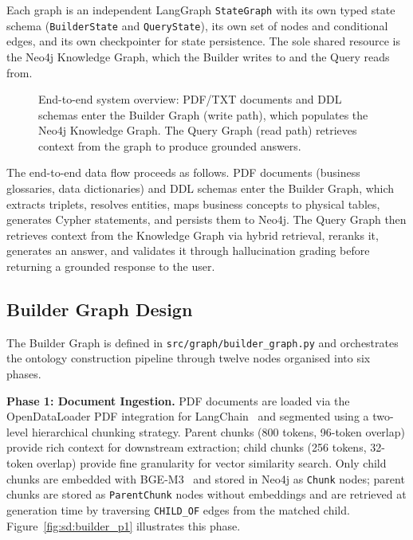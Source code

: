 Each graph is an independent LangGraph \texttt{StateGraph} with its own typed state schema (\texttt{BuilderState} and \texttt{QueryState}), its own set of nodes and conditional edges, and its own checkpointer for state persistence. The sole shared resource is the Neo4j Knowledge Graph, which the Builder writes to and the Query reads from.

\begin{figure}[htbp]
\centering
{}
\caption{End-to-end system overview: PDF/TXT documents and DDL schemas enter the Builder Graph (write path), which populates the Neo4j Knowledge Graph. The Query Graph (read path) retrieves context from the graph to produce grounded answers.}
\label{fig:sd:system_overview}
\end{figure}

The end-to-end data flow proceeds as follows. PDF documents (business glossaries, data dictionaries) and DDL schemas enter the Builder Graph, which extracts triplets, resolves entities, maps business concepts to physical tables, generates Cypher statements, and persists them to Neo4j. The Query Graph then retrieves context from the Knowledge Graph via hybrid retrieval, reranks it, generates an answer, and validates it through hallucination grading before returning a grounded response to the user.

\subsection{Builder Graph Design}
\label{sec:sd:builder}

The Builder Graph is defined in \texttt{src/\allowbreak{}graph/\allowbreak{}builder\_graph.py} and orchestrates the ontology construction pipeline through twelve nodes organised into six phases.

\textbf{Phase 1: Document Ingestion.} PDF documents are loaded via the OpenDataLoader PDF integration for LangChain~\cite{langchain2023github} and segmented using a two-level hierarchical chunking strategy. Parent chunks (800 tokens, 96-token overlap) provide rich context for downstream extraction; child chunks (256 tokens, 32-token overlap) provide fine granularity for vector similarity search. Only child chunks are embedded with BGE-M3~\cite{chen2024bgeM3embeddingmultilingualmultifunctionality} and stored in Neo4j as \texttt{Chunk} nodes; parent chunks are stored as \texttt{ParentChunk} nodes without embeddings and are retrieved at generation time by traversing \texttt{CHILD\_OF} edges from the matched child. Figure~\ref{fig:sd:builder_p1} illustrates this phase.

